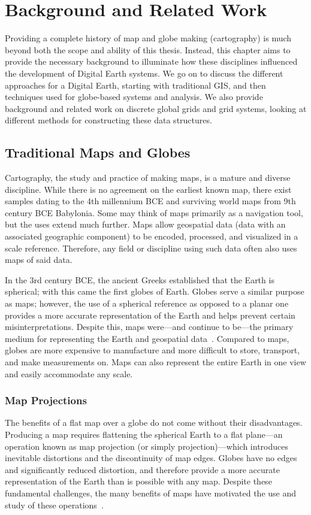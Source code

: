 \chapter{Background and Related Work} \label{chap:background}
Providing a complete history of map and globe making (cartography) is much beyond both the scope and ability of this thesis.
Instead, this chapter aims to provide the necessary background to illuminate how these disciplines influenced the development of Digital Earth systems.
We go on to discuss the different approaches for a Digital Earth, starting with traditional GIS, and then techniques used for globe-based systems and analysis.
We also provide background and related work on discrete global grids and grid systems, looking at different methods for constructing these data structures.


\section{Traditional Maps and Globes} \label{chap:2:maps}
Cartography, the study and practice of making maps, is a mature and diverse discipline.
While there is no agreement on the earliest known map, there exist samples dating to the 4th millennium BCE and surviving world maps from 9th century BCE Babylonia.
Some may think of maps primarily as a navigation tool, but the uses extend much further.
Maps allow geospatial data (data with an associated geographic component) to be encoded, processed, and visualized in a scale reference.
Therefore, any field or discipline using such data often also uses maps of said data.


In the 3rd century BCE, the ancient Greeks established that the Earth is spherical; with this came the first globes of Earth.
Globes serve a similar purpose as maps; however, the use of a spherical reference as opposed to a planar one provides a more accurate representation of the Earth and helps prevent certain misinterpretations.
Despite this, maps were---and continue to be---the primary medium for representing the Earth and geospatial data~\cite{hruby20182000}.
Compared to maps, globes are more expensive to manufacture and more difficult to store, transport, and make measurements on.
Maps can also represent the entire Earth in one view and easily accommodate any scale.


\subsection{Map Projections} \label{chap:2:projection}
The benefits of a flat map over a globe do not come without their disadvantages.
Producing a map requires flattening the spherical Earth to a flat plane---an operation known as map projection (or simply projection)---which introduces inevitable distortions and the discontinuity of map edges.
Globes have no edges and significantly reduced distortion, and therefore provide a more accurate representation of the Earth than is possible with any map.
Despite these fundamental challenges, the many benefits of maps have motivated the use and study of these operations~\cite{snyder1987map, snyder1997flattening}.


